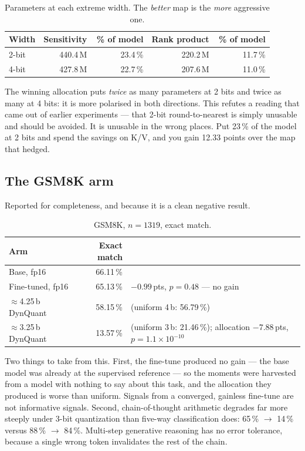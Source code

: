 \documentclass[11pt]{article}
\newcommand{\pt}{\,pts}
\newcommand{\pct}{\,\%}
\begin{document}
\begin{table}[H]
\centering\small
\caption{Parameters at each extreme width. The \emph{better} map is the \emph{more} aggressive
one.}
\begin{tabular}{lrrrr}
\toprule
Width & Sensitivity & \pct{} of model & Rank product & \pct{} of model \\
\midrule
2-bit & 440.4\,M & 23.4\pct & 220.2\,M & 11.7\pct \\
\rowcolor{rowtint}
4-bit & 427.8\,M & 22.7\pct & 207.6\,M & 11.0\pct \\
\bottomrule
\end{tabular}
\end{table}

The winning allocation puts \emph{twice} as many parameters at 2 bits and twice as many at 4
bits: it is more polarised in both directions. This refutes a reading that came out of earlier
experiments --- that 2-bit round-to-nearest is simply unusable and should be avoided. It is
unusable in the wrong places. Put 23\pct{} of the model at 2 bits and spend the savings on K/V,
and you gain 12.33 points over the map that hedged.

\subsection{The GSM8K arm}
\label{sec:gsm8k}

Reported for completeness, and because it is a clean negative result.

\begin{table}[H]
\centering\small
\caption{GSM8K, $n = 1319$, exact match.}
\begin{tabular}{lrl}
\toprule
Arm & Exact match & \\
\midrule
Base, fp16 & 66.11\pct & \\
\rowcolor{rowtint}
Fine-tuned, fp16 & 65.13\pct & $-0.99$\pt, $p = 0.48$ --- no gain \\
$\approx$4.25\,b DynQuant & 58.15\pct & (uniform 4\,b: 56.79\pct) \\
\rowcolor{rowtint}
$\approx$3.25\,b DynQuant & 13.57\pct & (uniform 3\,b: 21.46\pct); allocation $-7.88$\pt, $p = 1.1\times10^{-10}$ \\
\bottomrule
\end{tabular}
\end{table}

Two things to take from this. First, the fine-tune produced no gain --- the base model was
already at the supervised reference --- so the moments were harvested from a model with nothing
to say about this task, and the allocation they produced is worse than uniform. Signals from a
converged, gainless fine-tune are not informative signals. Second, chain-of-thought arithmetic
degrades far more steeply under 3-bit quantization than five-way classification does: 65\pct{}
$\to$ 14\pct{} versus 88\pct{} $\to$ 84\pct. Multi-step generative reasoning has no error
tolerance, because a single wrong token invalidates the rest of the chain.
\end{document}
